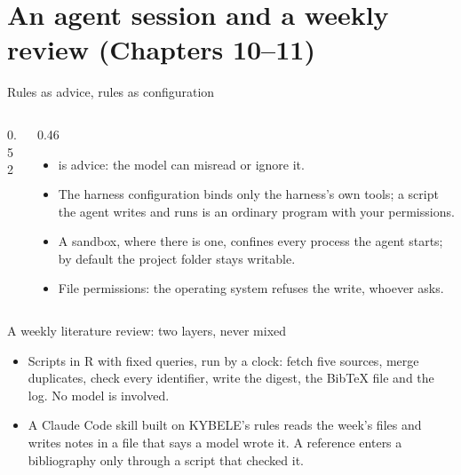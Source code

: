 \documentclass[11pt,aspectratio=169]{beamer}
\begin{document}
\section{An agent session and a weekly review (Chapters 10--11)}

\begin{frame}{Rules as advice, rules as configuration}
  \begin{columns}[T]
    \begin{column}{0.52\textwidth}
    \end{column}
    \begin{column}{0.46\textwidth}\small
      \begin{itemize}
        \item {} is advice: the model can misread or
          ignore it.
        \item The harness configuration binds only the harness's own
          tools; a script the agent writes and runs is an ordinary program
          with your permissions.
        \item A sandbox, where there is one, confines every process the
          agent starts; by default the project folder stays writable.
        \item File permissions: the operating system refuses the write,
          whoever asks.
      \end{itemize}
    \end{column}
  \end{columns}
\end{frame}

\begin{frame}{A weekly literature review: two layers, never mixed}
  \begingroup{}\endgroup
  \begin{itemize}
    \item Scripts in R with fixed queries, run by a clock: fetch five
      sources, merge duplicates, check every identifier, write the digest,
      the BibTeX file and the log. No model is involved.
    \item A Claude Code skill built on KYBELE's rules reads the week's
      files and writes notes in a file that says a model wrote it. A
      reference enters a bibliography only through a script that checked it.
  \end{itemize}
\end{frame}
\end{document}
